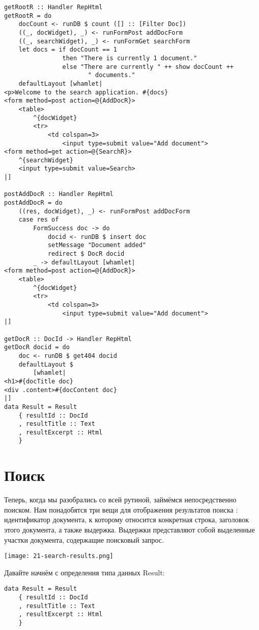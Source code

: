 \begin{lstlisting}
getRootR :: Handler RepHtml
getRootR = do
    docCount <- runDB $ count ([] :: [Filter Doc])
    ((_, docWidget), _) <- runFormPost addDocForm
    ((_, searchWidget), _) <- runFormGet searchForm
    let docs = if docCount == 1
                then "There is currently 1 document."
                else "There are currently " ++ show docCount ++
                       " documents."
    defaultLayout [whamlet|
<p>Welcome to the search application. #{docs}
<form method=post action=@{AddDocR}>
    <table>
        ^{docWidget}
        <tr>
            <td colspan=3>
                <input type=submit value="Add document">
<form method=get action=@{SearchR}>
    ^{searchWidget}
    <input type=submit value=Search>
|]

postAddDocR :: Handler RepHtml
postAddDocR = do
    ((res, docWidget), _) <- runFormPost addDocForm
    case res of
        FormSuccess doc -> do
            docid <- runDB $ insert doc
            setMessage "Document added"
            redirect $ DocR docid
        _ -> defaultLayout [whamlet|
<form method=post action=@{AddDocR}>
    <table>
        ^{docWidget}
        <tr>
            <td colspan=3>
                <input type=submit value="Add document">
|]

getDocR :: DocId -> Handler RepHtml
getDocR docid = do
    doc <- runDB $ get404 docid
    defaultLayout $
        [whamlet|
<h1>#{docTitle doc}
<div .content>#{docContent doc}
|]
data Result = Result
    { resultId :: DocId
    , resultTitle :: Text
    , resultExcerpt :: Html
    }
\end{lstlisting}%

\section{Поиск} %

Теперь, когда мы разобрались со всей рутиной, займёмся непосредственно поиском. Нам понадобятся три вещи для отображения  результатов поиска : идентификатор документа, к которому относится конкретная строка, заголовок этого документа, а также выдержка. Выдержки представляют собой выделенные участки документа, содержащие поисковый запрос.

\texttt{[image: 21-search-results.png]} %

Давайте начнём с определения типа данных Result:

\begin{lstlisting}
data Result = Result
    { resultId :: DocId
    , resultTitle :: Text
    , resultExcerpt :: Html
    }
\end{lstlisting}

